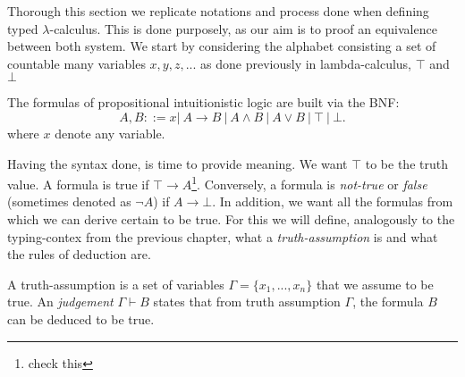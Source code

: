 Thorough this section we replicate notations and process done when defining typed $\lambda$-calculus. This is done purposely, as our aim is to proof an equivalence between both system. We start by considering the alphabet consisting a set of countable many variables $x,y,z,...$ as done previously in lambda-calculus, $\top$ and $\bot$ 

\begin{definition}
  The formulas of propositional intuitionistic logic are built via the BNF:
  $$A,B ::= x |\ A\to B\ |\ A \land B \ |\ A \lor B \ |\ \top \ |\ \bot .$$
  where $x$ denote any variable.
\end{definition}




Having the syntax done, is time to provide meaning. We want $\top$ to be the truth value. A formula is true if $\top \to A$\footnote{check this}. Conversely, a formula is \emph{not-true} or \emph{false} (sometimes denoted as $\neg A$) if $ A \to \bot$. In addition, we want all the formulas from which we can derive certain to be true. For this we will define, analogously to the typing-contex from the previous chapter, what a \emph{truth-assumption} is and  what the rules of deduction are.

\begin{definition}
  A truth-assumption is a set of variables $\Gamma = \{x_1,...,x_n\}$ that we assume to be true. An \emph{judgement} $\Gamma \vdash B$ states that from truth assumption $\Gamma$, the formula $B$ can be deduced to be true. 
\end{definition}

